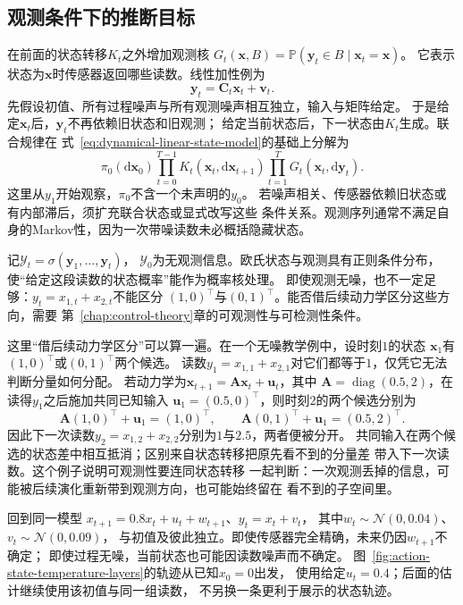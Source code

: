 \subsection{观测条件下的推断目标}
在前面的状态转移$K_t$之外增加观测核
$G_t(\bm x,B)=\mathbb P(\bm y_t\in B\mid\bm x_t=\bm x)$。
它表示状态为$\bm x$时传感器返回哪些读数。线性加性例为
\begin{equation}
  \bm y_t=\bm C_t\bm x_t+\bm v_t.
  \label{eq:dynamical-linear-observation-model}
\end{equation}
先假设初值、所有过程噪声与所有观测噪声相互独立，输入与矩阵给定。
于是给定$\bm x_t$后，$\bm y_t$不再依赖旧状态和旧观测；
给定当前状态后，下一状态由$K_t$生成。联合规律在
式~\eqref{eq:dynamical-linear-state-model}的基础上分解为
\[
 \pi_0(\mathrm d\bm x_0)
       \prod_{t=0}^{T-1}K_t(\bm x_t,\mathrm d\bm x_{t+1})
       \prod_{t=1}^T G_t(\bm x_t,\mathrm d\bm y_t).
\]
这里从$y_1$开始观察，$\pi_0$不含一个未声明的$y_0$。
若噪声相关、传感器依赖旧状态或有内部滞后，须扩充联合状态或显式改写这些
条件关系。观测序列通常不满足自身的Markov性，因为一次带噪读数未必概括隐藏状态。

记$\mathcal Y_t=\sigma(\bm y_1,\ldots,\bm y_t)$，
$\mathcal Y_0$为无观测信息。欧氏状态与观测具有正则条件分布，
使“给定这段读数的状态概率”能作为概率核处理。
即使观测无噪，也不一定足够：$y_t=x_{1,t}+x_{2,t}$不能区分
$(1,0)^\top$与$(0,1)^\top$。能否借后续动力学区分这些方向，需要
第~\ref{chap:control-theory}章的可观测性与可检测性条件。

这里“借后续动力学区分”可以算一遍。在一个无噪教学例中，设时刻$1$的状态
$\bm x_1$有$(1,0)^\top$或$(0,1)^\top$两个候选。
读数$y_1=x_{1,1}+x_{2,1}$对它们都等于$1$，仅凭它无法判断分量如何分配。
若动力学为$\bm x_{t+1}=\bm A\bm x_t+\bm u_t$，其中
$\bm A=\operatorname{diag}(0.5,2)$，在读得$y_1$之后施加共同已知输入
$\bm u_1=(0.5,0)^\top$，则时刻$2$的两个候选分别为
\[
 \bm A(1,0)^\top+\bm u_1=(1,0)^\top,\qquad
 \bm A(0,1)^\top+\bm u_1=(0.5,2)^\top.
\]
因此下一次读数$y_2=x_{1,2}+x_{2,2}$分别为$1$与$2.5$，两者便被分开。
共同输入在两个候选的状态差中相互抵消；区别来自状态转移把原先看不到的分量差
带入下一次读数。这个例子说明可观测性要连同状态转移
一起判断：一次观测丢掉的信息，可能被后续演化重新带到观测方向，也可能始终留在
看不到的子空间里。

\begin{example}[带泄漏温度的间接观测]
 \label{ex:dynamical-noisy-temperature}
 回到同一模型
 $x_{t+1}=0.8x_t+u_t+w_{t+1}$、$y_t=x_t+v_t$，
 其中$w_t\sim\mathcal N(0,0.04)$、$v_t\sim\mathcal N(0,0.09)$，
 与初值及彼此独立。即使传感器完全精确，未来仍因$w_{t+1}$不确定；
 即使过程无噪，当前状态也可能因读数噪声而不确定。
 图~\ref{fig:action-state-temperature-layers}的轨迹从已知$x_0=0$出发，
 使用给定$u_t=0.4$；后面的估计继续使用该初值与同一组读数，
 不另换一条更利于展示的状态轨迹。
\end{example}

